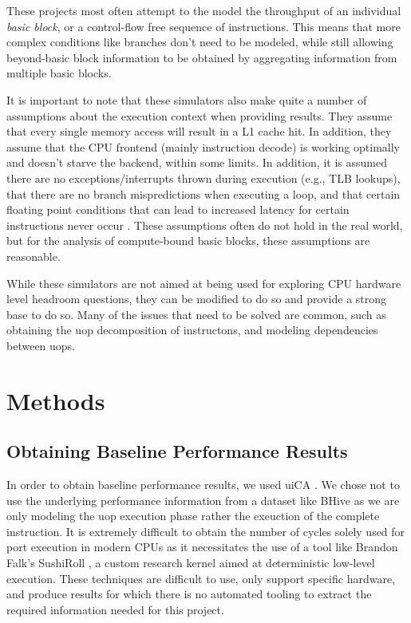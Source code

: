 \documentclass[sigconf]{acmart}
\begin{document}
These projects most often attempt to the model the throughput of an individual \textit{basic block}, or a
control-flow free sequence of instructions. This means that more complex conditions like branches don't need
to be modeled, while still allowing beyond-basic block information to be obtained by aggregating information
from multiple basic blocks.

It is important to note that these simulators also make quite a number of assumptions about the execution context
when providing results. They assume that every single memory access will result in a L1 cache hit. In addition,
they assume that the CPU frontend (mainly instruction decode) is working optimally and doesn't starve the backend,
within some limits. In addition, it is assumed there are no exceptions/interrupts thrown during execution (e.g.,
TLB lookups), that there are no branch mispredictions when executing a loop, and that certain floating point
conditions that can lead to increased latency for certain instructions never occur \cite{abel2022uica}. These
assumptions often do not hold in the real world, but for the analysis of compute-bound basic blocks, these
assumptions are reasonable.

While these simulators are not aimed at being used for exploring CPU hardware level headroom questions, they can
be modified to do so and provide a strong base to do so. Many of the issues that need to be solved are common,
such as obtaining the uop decomposition of instructons, and modeling dependencies between uops.

\section{Methods}

\subsection{Obtaining Baseline Performance Results}

In order to obtain baseline performance results, we used uiCA \cite{abel2022uica}. We chose not to use the
underlying performance information from a dataset like BHive as we are only modeling the uop execution
phase rather the exeuction of the complete instruction. It is extremely difficult to obtain the number of cycles
solely used for port execution in modern CPUs as it necessitates the use of a tool like Brandon Falk's SushiRoll
\cite{falk2019sushiroll}, a custom research kernel aimed at deterministic low-level execution. These techniques are
difficult to use, only support specific hardware, and produce results for which there is no automated tooling
to extract the required information needed for this project.
\end{document}
